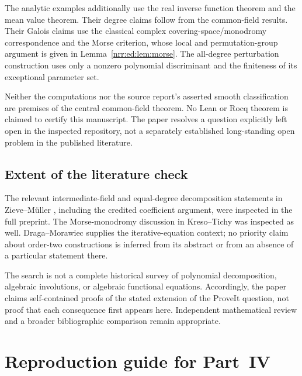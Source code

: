 \documentclass[11pt,letterpaper]{article}
\theoremstyle{definition}
\theoremstyle{remark}
\begin{document}
The analytic examples additionally use the real inverse function theorem and the
mean value theorem. Their degree claims follow from the common-field results.
Their Galois claims use the classical complex covering-space/monodromy correspondence
and the Morse criterion, whose local and permutation-group argument is given in
Lemma~\ref{nrr:ed:lem:morse}. The all-degree perturbation construction uses only a nonzero
polynomial discriminant and the finiteness of its exceptional parameter set.

Neither the computations nor the source report's asserted smooth classification
are premises of the central common-field theorem. No Lean or Rocq theorem is
claimed to certify this manuscript. The paper resolves a question explicitly
left open in the inspected repository, not a separately established long-standing
open problem in the published literature.

\subsection{Extent of the literature check}

The relevant intermediate-field and equal-degree decomposition statements in
Zieve--M\"uller \cite{ZM2008}, including the credited coefficient argument,
were inspected in the full preprint. The Morse-monodromy discussion in
Kreso--Tichy \cite{KT2016} was inspected as well. Draga--Morawiec
\cite{DM2016} supplies the iterative-equation context; no priority claim
about order-two constructions is inferred from its abstract or from an absence
of a particular statement there.

The search is not a complete historical survey of polynomial decomposition,
algebraic involutions, or algebraic functional equations. Accordingly, the paper
claims self-contained proofs of the stated extension of the ProveIt question,
not proof that each consequence first appears here. Independent mathematical
review and a broader bibliographic comparison remain appropriate.

\section{Reproduction guide for Part~IV}
\label{nrr:ed:app:reproduce}
\end{document}

